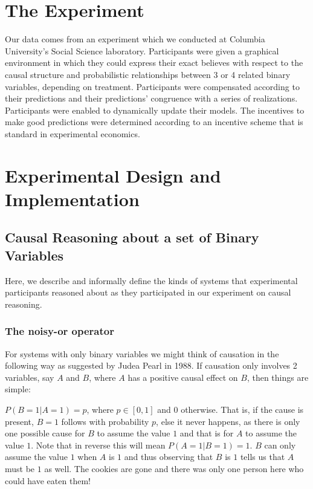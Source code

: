 \section{The Experiment} 

Our data comes from an experiment which we conducted at Columbia University's Social Science laboratory.  Participants were given a graphical environment in which they could express their exact believes with respect to the causal structure and probabilistic relationships between 3 or 4 related binary variables, depending on treatment.  Participants were compensated according to their predictions and their predictions' congruence with a series of realizations.  Participants were enabled to dynamically update their models.   The incentives to make good predictions were determined according to an incentive scheme that is standard in experimental economics.  

\section{Experimental Design and Implementation}

\subsection{Causal Reasoning about a set of Binary Variables}

Here, we describe and informally define the kinds of systems that experimental participants reasoned about as they participated in our experiment on causal reasoning. 

\subsubsection{The noisy-or operator \citep{Pearl88}}

For systems with only binary variables we might think of causation in the following way as suggested by Judea Pearl in 1988.  If causation only involves 2 variables, say $A$ and $B$, where $A$ has a positive causal effect on $B$, then things are simple:

$P(B = 1 | A = 1) = p$, where $p \in [0, 1]$ and 0 otherwise.  That is, if the cause is present, $B=1$ follows with probability $p$, else it never happens, as there is only one possible cause for $B$ to assume the value $1$ and that is for $A$ to assume the value $1$. Note that in reverse this will mean $P(A=1|B=1)=1$. $B$ can only assume the value $1$ when $A$ is $1$ and thus observing that $B$ is $1$ tells us that $A$ must be $1$ as well. The cookies are gone and there was only one person here who could have eaten them! 

